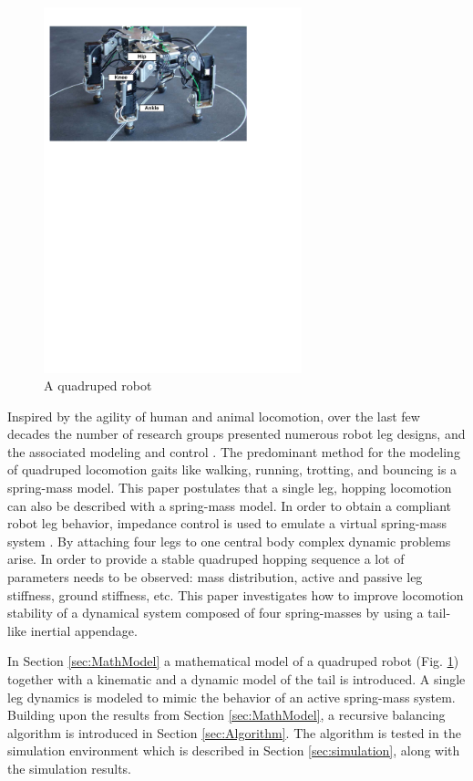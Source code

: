 \begin{figure}
                \centering
                \includegraphics[width=75mm]{./pictures/Dynarobin_introduction_image.pdf}
                \caption{A quadruped robot}
                \label{fig:Dynarobin}
\end{figure}
 
Inspired by the agility of human and animal locomotion, over the last few decades  the number of research groups presented numerous robot leg designs, and the associated modeling and control \cite{CambridgeJournals:1345088}. The predominant method for the modeling of quadruped locomotion gaits like walking, running, trotting, and bouncing is a spring-mass model\cite{Blickhan01}. This paper postulates that a single leg, hopping locomotion can also be described with a spring-mass model. In order to obtain a compliant robot leg behavior, impedance control is used to emulate a virtual spring-mass system \cite{Havoutis01}. By attaching four legs to one central body complex dynamic problems arise. In order to provide a stable quadruped hopping sequence a lot of parameters needs to be observed: mass distribution, active and passive leg stiffness, ground stiffness, etc. This paper investigates how to improve locomotion stability of a dynamical system composed of four spring-masses by using a tail-like inertial appendage.
 
In Section \ref{sec:MathModel} a mathematical model of a quadruped robot (Fig. \ref{fig:Dynarobin}) together with a kinematic and a dynamic model of the tail is introduced. A single leg dynamics is modeled to mimic the behavior of an active spring-mass system. Building upon the results from Section \ref{sec:MathModel}, a recursive balancing algorithm is introduced in Section \ref{sec:Algorithm}. The algorithm is tested in the simulation environment which is described in Section \ref{sec:simulation}, along with the simulation results.




